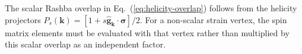 \documentclass[aps,prb,reprint,superscriptaddress]{revtex4-2}
\begin{document}
The scalar Rashba overlap in Eq.~(\ref{eq:helicity-overlap}) follows from the helicity projectors $P_s(\bm k)=[1+s\hat{\bm g}_{\bm k}\cdot\bm\sigma]/2$. For a non-scalar strain vertex, the spin matrix elements must be evaluated with that vertex rather than multiplied by this scalar overlap as an independent factor.



\end{document}
